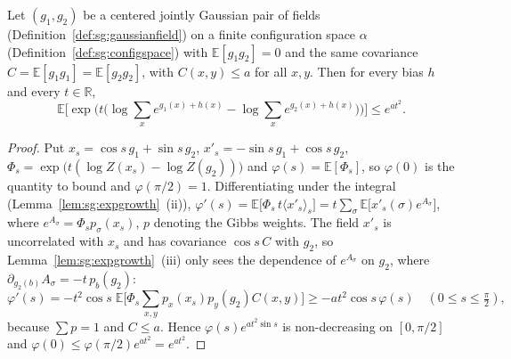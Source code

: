 \begin{theorem}\label{thm:sg:expmoment}
  \leanok
Let $(g_1,g_2)$ be a centered jointly Gaussian pair of fields (Definition~\ref{def:sg:gaussianfield}) on a finite configuration space $\alpha$ (Definition~\ref{def:sg:configspace}) with $\mathbb E[g_1g_2]=0$ and the same covariance
$C=\mathbb E[g_1g_1]=\mathbb E[g_2g_2]$, with $C(x,y)\le a$ for all $x,y$. Then for every bias $h$ and every $t\in\mathbb R$,
\[\mathbb E\Big[\exp\Big(t\Big(\log\sum_xe^{g_1(x)+h(x)}-\log\sum_xe^{g_2(x)+h(x)}\Big)\Big)\Big]\le e^{at^2}.\]
\end{theorem}

\begin{proof}
  \leanok
Put $x_s=\cos s\,g_1+\sin s\,g_2$, $x'_s=-\sin s\,g_1+\cos s\,g_2$, $\Phi_s=\exp\big(t(\log Z(x_s)-\log Z(g_2))\big)$ and $\varphi(s)=\mathbb E[\Phi_s]$,
so $\varphi(0)$ is the quantity to bound and $\varphi(\pi/2)=1$. Differentiating under the integral (Lemma~\ref{lem:sg:expgrowth}~(ii)),
$\varphi'(s)=\mathbb E\big[\Phi_s\,t\langle x'_s\rangle_s\big]=t\sum_\sigma\mathbb E\big[x'_s(\sigma)e^{A_\sigma}\big]$, where $e^{A_\sigma}=\Phi_sp_\sigma(x_s)$,
$p$ denoting the Gibbs weights. The field $x'_s$ is uncorrelated with $x_s$ and has covariance $\cos s\,C$ with $g_2$, so
Lemma~\ref{lem:sg:expgrowth}~(iii) only sees the dependence of $e^{A_\sigma}$ on $g_2$, where $\partial_{g_2(b)}A_\sigma=-t\,p_b(g_2)$:
\[\varphi'(s)=-t^2\cos s\;\mathbb E\Big[\Phi_s\sum_{x,y}p_x(x_s)p_y(g_2)C(x,y)\Big]\ge-at^2\cos s\,\varphi(s)\quad(0\le s\le\tfrac\pi2),\]
because $\sum p=1$ and $C\le a$. Hence $\varphi(s)e^{at^2\sin s}$ is non-decreasing on $[0,\pi/2]$ and $\varphi(0)\le\varphi(\pi/2)e^{at^2}=e^{at^2}$.
\end{proof}

